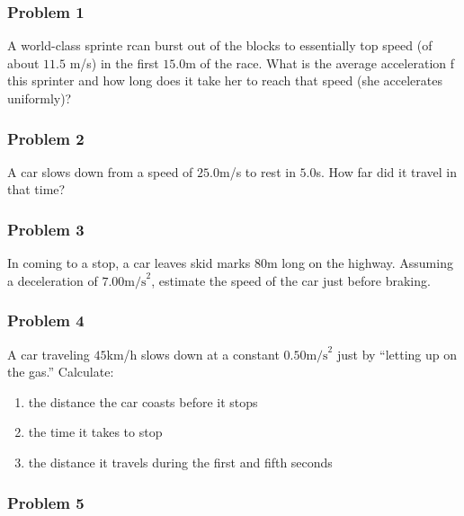 \documentclass[
  letterpaper,
  DIV=11,
  numbers=noendperiod]{scrartcl}
\providecommand{\tightlist}{%
  \setlength{\itemsep}{0pt}\setlength{\parskip}{0pt}}\usepackage{longtable,booktabs,array}
\begin{document}
\hypertarget{problem-1}{%
\subsubsection{Problem 1}\label{problem-1}}

A world-class sprinte rcan burst out of the blocks to essentially top
speed (of about \(11.5\) m/s) in the first \(15.0\)m of the race. What
is the average acceleration f this sprinter and how long does it take
her to reach that speed (she accelerates uniformly)?

\hypertarget{problem-2}{%
\subsubsection{Problem 2}\label{problem-2}}

A car slows down from a speed of \(25.0\)m/s to rest in \(5.0\)s. How
far did it travel in that time?

\hypertarget{problem-3}{%
\subsubsection{Problem 3}\label{problem-3}}

In coming to a stop, a car leaves skid marks 80m long on the highway.
Assuming a deceleration of \(7.00 \text{m/s}^2\), estimate the speed of
the car just before braking.

\hypertarget{problem-4}{%
\subsubsection{Problem 4}\label{problem-4}}

A car traveling \(45\)km/h slows down at a constant
\(0.50 \text{m/s}^2\) just by ``letting up on the gas.'' Calculate:

\begin{enumerate}
\def\labelenumi{(\alph{enumi})}
\tightlist
\item
  the distance the car coasts before it stops
\item
  the time it takes to stop
\item
  the distance it travels during the first and fifth seconds
\end{enumerate}

\hypertarget{problem-5}{%
\subsubsection{Problem 5}\label{problem-5}}
\end{document}
